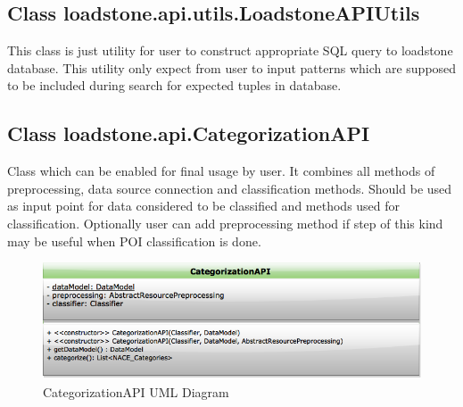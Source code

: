 \subsection{Class loadstone.api.utils.LoadstoneAPIUtils}
This class is just utility for user to construct appropriate SQL query to loadstone database. This utility only expect from user to input patterns which are supposed to be included during search for expected tuples in database. 

\subsection{Class loadstone.api.CategorizationAPI}
Class which can be enabled for final usage by user. It combines all methods of preprocessing, data source connection and classification methods. Should be used as input point for data considered to be classified and methods used for classification. Optionally user can add preprocessing method if step of this kind may be useful when POI classification is done.

\begin{figure}[h]
	\centering
	\includegraphics[scale=0.5]{CategorizationAPI.png}
	\caption{CategorizationAPI UML Diagram}
	\label{fig:@=CategorizationAPI}
\end{figure}